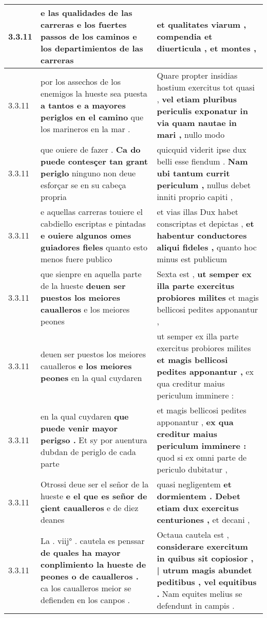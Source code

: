 \begin{tabular}{|p{1cm}|p{6.5cm}|p{6.5cm}|}
3.3.11 & e las qualidades de las carreras \textbf{ e los fuertes passos de los caminos } e los departimientos de las carreras & et qualitates viarum , \textbf{ compendia et diuerticula , } et montes , \\\hline
3.3.11 & por los assechos de los enemigos la hueste sea puesta \textbf{ a tantos e a mayores periglos en el camino } que los marineros en la mar . & Quare propter insidias hostium exercitus tot quasi , \textbf{ vel etiam pluribus periculis exponatur in via quam nautae in mari , } nullo modo \\\hline
3.3.11 & que ouiere de fazer . \textbf{ Ca do puede contesçer tan grant periglo } ninguno non deue esforçar se en su cabeça propria & quicquid viderit ipse dux belli esse fiendum . \textbf{ Nam ubi tantum currit periculum , } nullus debet inniti proprio capiti , \\\hline
3.3.11 & e aquellas carreras touiere el cabdiello escriptas e pintadas \textbf{ e ouiere algunos omes guiadores fieles } quanto esto menos fuere publico & et vias illas Dux habet conscriptas et depictas , \textbf{ et habentur conductores aliqui fideles , } quanto hoc minus est publicum \\\hline
3.3.11 & que sienpre en aquella parte de la hueste \textbf{ deuen ser puestos los meiores caualleros } e los meiores peones & Sexta est , \textbf{ ut semper ex illa parte exercitus probiores milites } et magis bellicosi pedites apponantur , \\\hline
3.3.11 & deuen ser puestos los meiores caualleros \textbf{ e los meiores peones } en la qual cuydaren & ut semper ex illa parte exercitus probiores milites \textbf{ et magis bellicosi pedites apponantur , } ex qua creditur maius periculum imminere : \\\hline
3.3.11 & en la qual cuydaren \textbf{ que puede venir mayor perigso . } Et sy por auentura dubdan de periglo de cada parte & et magis bellicosi pedites apponantur , \textbf{ ex qua creditur maius periculum imminere : } quod si ex omni parte de periculo dubitatur , \\\hline
3.3.11 & Otrossi deue ser el señor de la hueste \textbf{ e el que es señor de çient caualleros } e de diez deanes & quasi negligentem \textbf{ et dormientem . Debet etiam dux exercitus centuriones , } et decani , \\\hline
3.3.11 & La . viij° . cautela es penssar \textbf{ de quales ha mayor conplimiento la hueste de peones o de caualleros . } ca los caualleros meior se defienden en los canpos . & Octaua cautela est , \textbf{ considerare exercitum in quibus sit copiosior , | utrum magis abundet peditibus , vel equitibus . } Nam equites melius se defendunt in campis . \\\hline

\end{tabular}
